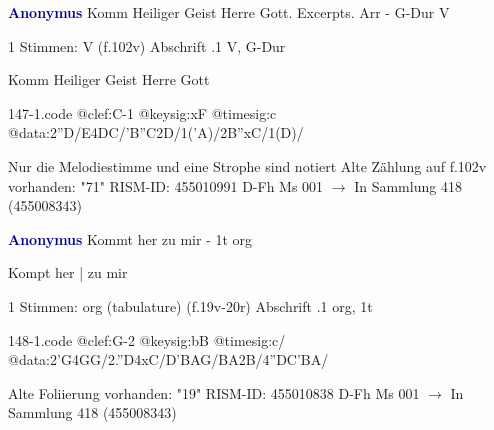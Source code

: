 \documentclass[twocolumn]{book}
\begin{document}
\newline \par \vspace{7pt} \textcolor{darkblue}{\textbf{Anonymus  }}
\newline Komm Heiliger Geist Herre Gott. Excerpts. Arr - G-Dur
\newline V
\newline \begin{itshape}\end{itshape} 
\newline \textcolor{darkblue}{}  1 Stimmen: V  (f.102v)
\newline Abschrift
.1  V, G-Dur
\newline \begin{footnotesize} Komm Heiliger Geist Herre Gott \end{footnotesize}  
\begin{filecontents*}{147-1.code}
@clef:C-1
@keysig:xF
@timesig:c
@data:2''D/E4DC/'B''C2D/1('A)/2B''xC/1(D)/
\end{filecontents*}
\newline
%
\newline Nur die Melodiestimme und eine Strophe sind notiert
\newline Alte Zählung auf f.102v vorhanden: "71"
\newline RISM-ID: 455010991
\newline D-Fh  Ms 001
\newline $\rightarrow$ In Sammlung 418 (455008343)
      
\newline \par \vspace{7pt} \textcolor{darkblue}{\textbf{Anonymus  }}
\newline Kommt her zu mir - 1t
\newline org
\newline \begin{itshape}[f.19v, at left:] Kompt her | zu mir\end{itshape} 
\newline \textcolor{darkblue}{}  1 Stimmen: org (tabulature)  (f.19v-20r)
\newline Abschrift
.1  org, 1t  
\begin{filecontents*}{148-1.code}
@clef:G-2
@keysig:bB
@timesig:c/
@data:2'G4GG/2.''D4xC/D'BAG/BA2B/4''DC'BA/
\end{filecontents*}
\newline
%
\newline Alte Foliierung vorhanden: "19"
\newline RISM-ID: 455010838
\newline D-Fh  Ms 001
\newline $\rightarrow$ In Sammlung 418 (455008343)
      
\end{document}
